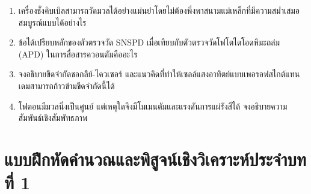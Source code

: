 \begin{enumerate}
    \item เครื่องชั่งคิบเบิลสามารถวัดมวลได้อย่างแม่นยำโดยไม่ต้องพึ่งพาสนามแม่เหล็กที่มีความสม่ำเสมอสมบูรณ์แบบได้อย่างไร
    \item ข้อได้เปรียบหลักของตัวตรวจวัด SNSPD เมื่อเทียบกับตัวตรวจวัดโฟโตไดโอดหิมะถล่ม (APD) ในการสื่อสารควอนตัมคืออะไร
    \item จงอธิบายขีดจำกัดชอกลีย์-ไควเซอร์ และแนวคิดที่ทำให้เซลล์แสงอาทิตย์แบบเพอรอฟสไกต์แทนเดมสามารถก้าวข้ามขีดจำกัดนี้ได้
    \item โฟตอนมีมวลนิ่งเป็นศูนย์ แต่เหตุใดจึงมีโมเมนตัมและแรงดันการแผ่รังสีได้ จงอธิบายความสัมพันธ์เชิงสัมพัทธภาพ
\end{enumerate}

\section{แบบฝึกหัดคำนวณและพิสูจน์เชิงวิเคราะห์ประจำบทที่ 1}

